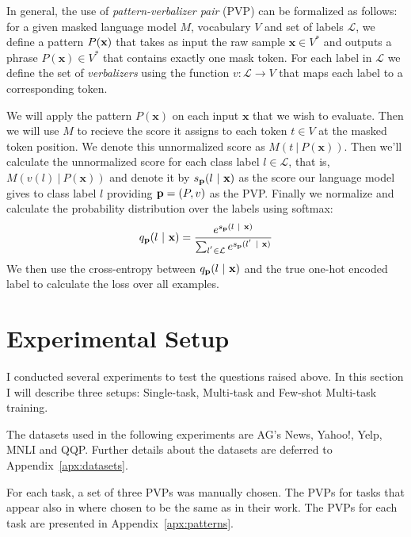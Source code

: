 \documentclass[11pt,a4paper]{article}
\begin{document}
In general, the use of \textit{pattern-verbalizer pair} (PVP) can be formalized as follows: for a given masked language model $M$, vocabulary $V$ and set of labels $\mathcal{L}$, we define a pattern $P(\textbf{\text{x}})$ that takes as input the raw sample $\textbf{x}\in{}V^*$ and outputs a phrase $P(\textbf{x})\in{}V^*$ that contains exactly one mask token.
For each label in $\mathcal{L}$ we define the set of \textit{verbalizers} using the function $v:\mathcal{L}\rightarrow{}V$ that maps each label to a corresponding token.

We will apply the pattern $P(\textbf{x})$ on each input $\textbf{x}$ that we wish to evaluate.
Then we will use $M$ to recieve the score it assigns to each token $t\in{}V$ at the masked token position.
We denote this unnormalized score as $M(t\ |\ P(\textbf{x}))$.
Then we'll calculate the unnormalized score for each class label $l\in{}\mathcal{L}$, that is, $M(v(l)\ |\ P(\textbf{x}))$ and denote it by $s_{\text{\textbf{p}}}(l\ |\ \textbf{x})$ as the score our language model gives to class label $l$ providing $\text{\textbf{p}}=(P, v)$ as the PVP.
Finally we normalize and calculate the probability distribution over the labels using softmax:
\[
	q_\text{\textbf{p}}(l\ |\ \textbf{x}) = \frac{e^{s_{\text{\textbf{p}}}(l\ |\ \textbf{x})}}{\sum_{l^{'}\in{}\mathcal{L}}e^{s_{\text{\textbf{p}}}(l^{'}\ |\ \textbf{x})}}
\]
We then use the cross-entropy between $q_\text{\textbf{p}}(l\ |\ \textbf{x})$ and the true one-hot encoded label to calculate the loss over all examples. 

\section{Experimental Setup}
\label{sec:experiments}



I conducted several experiments to test the questions raised above.
In this section I will describe three setups: Single-task, Multi-task and Few-shot Multi-task training.

The datasets used in the following experiments are AG's News, Yahoo!, Yelp, MNLI and QQP.
Further details about the datasets are deferred to Appendix~\ref{apx:datasets}.

For each task, a set of three PVPs was manually chosen.
The PVPs for tasks that appear also in \citet{schick2020exploiting} where chosen to be the same as in their work.
The PVPs for each task are presented in Appendix~\ref{apx:patterns}.
\end{document}
